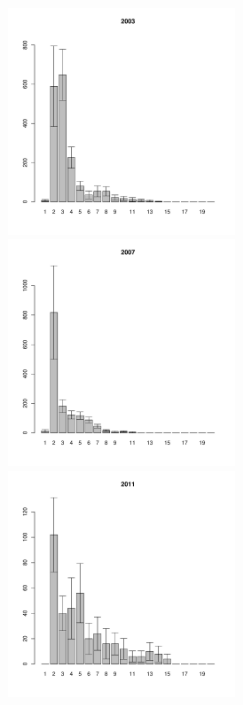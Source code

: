 \begin{figure}[h]
\begin{multicols}{3}
\hfill
\includegraphics[width=60mm]{../White_Sea/Ryashkov_YuG/YuG_2003_.pdf}
\hfill
\includegraphics[width=60mm]{../White_Sea/Ryashkov_YuG/YuG_2007_.pdf}
\hfill
\includegraphics[width=60mm]{../White_Sea/Ryashkov_YuG/YuG_2011_.pdf}
\end{multicols}



\end{figure}
